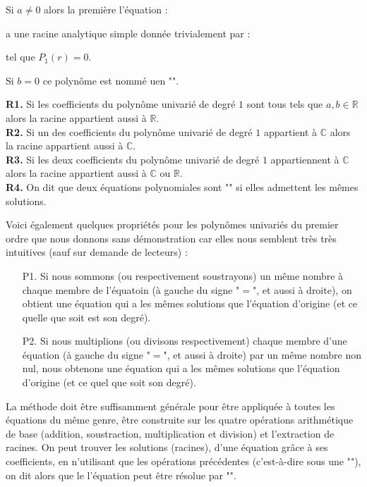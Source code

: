	Si $a\neq 0$ alors la première l'équation :
	
	a une racine analytique simple donnée trivialement par :
	
	tel que $P_1(r)=0$.
	
	Si $b=0$ ce polynôme est nommé uen "".
	
	\begin{tcolorbox}[title=Remarques,colframe=black,arc=10pt]
	\textbf{R1.} Si les coefficients du polynôme univarié de degré $1$ sont tous tels que $a,b\in \mathbb{R}$ alors la racine appartient aussi à $\mathbb{R}$.\\
	
	\textbf{R2.} Si un des coefficients du polynôme univarié de degré $1$ appartient à $\mathbb{C}$ alors la racine appartient aussi à $\mathbb{C}$.\\
	
	\textbf{R3.} Si les deux coefficients du polynôme univarié de degré $1$ appartiennent à $\mathbb{C}$ alors la racine appartient aussi à $\mathbb{C}$ ou $\mathbb{R}$.\\
	
	\textbf{R4.} On dit que deux équations polynomiales sont "" si elles admettent les mêmes solutions.
	\end{tcolorbox}
	Voici également quelques propriétés pour les polynômes univariés du premier ordre que nous donnons sans démonstration car elles nous semblent très très intuitives (sauf sur demande de lecteurs) :
	\begin{enumerate}
		\item[P1.] Si nous sommons (ou respectivement soustrayons) un même nombre à chaque membre de l'équatoin (à gauche du signe "$=$", et aussi à droite), on obtient une équation qui a les mêmes solutions que l'équation d'origine (et ce quelle que soit est son degré).
	
		\item[P2.] Si nous multiplions (ou divisons respectivement) chaque membre d'une équation (à gauche du signe "$=$", et aussi à droite) par un même nombre non nul, nous obtenons une équation qui a les mêmes solutions que l'équation d'origine (et ce quel que soit son degré).
	\end{enumerate}
	La méthode doit être suffisamment générale pour être appliquée à toutes les équations du même genre, être construite sur les quatre opérations arithmétique de base (addition, soustraction, multiplication et division) et l'extraction de racines. On peut trouver les solutions (racines), d'une équation grâce à ses coefficients, en n'utilisant que les opérations précédentes (c'est-à-dire sous une ""), on dit alors que le l'équation peut être résolue par "".
	
